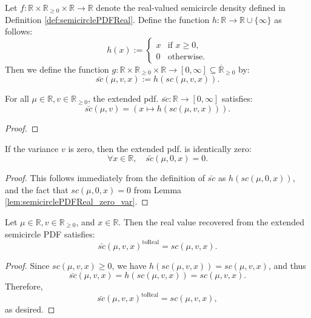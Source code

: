 \begin{definition}
  \label{def:semicirclePDF}
  \leanok
  Let $f : \mathbb{R} \times \mathbb{R}_{\geq 0} \times \mathbb{R} \to \mathbb{R}$ denote the real-valued semicircle density defined in Definition \ref{def:semicirclePDFReal}. Define the function $h: \mathbb{R} \to \mathbb{R} \cup \{\infty\} $ as follows:
  $$
  h(x) := \begin{cases}
x & \text{if } x \ge 0, \\
0 & \text{otherwise}.
\end{cases}
  $$
  Then we define the function $ g : \mathbb{R} \times \mathbb{R}_{\geq 0} \times \mathbb{R} \to [0,\infty] \subseteq \overline{\mathbb{R}}_{\ge 0}$ by:
    $$
    \bar{sc} (\mu,v,x) := h(sc(\mu,v,x)).
    $$
\end{definition}

\begin{lemma}
  \leanok
  \label{lem:semicirclePDF_def}
  For all $\mu \in \mathbb{R} , v \in \mathbb{R}_{\geq 0}$, the extended pdf. $ \bar{sc} : \mathbb{R} \to [0,\infty]$  satisfies:
  $$
    \bar{sc}(\mu,v) = \left( x \mapsto h(sc(\mu,v,x)) \right).
  $$
\end{lemma}
\begin{proof}
  \leanok
\end{proof}


\begin{lemma}
  \leanok
  \label{lem:semicirclePDF_zero_var}
  If the variance $v$ is zero, then the extended pdf. is identically zero:
 $$
    \forall x \in \mathbb{R}, \quad \bar{sc}(\mu,0,x) = 0.
 $$
\end{lemma}
\begin{proof}
    \leanok
    This follows immediately from the definition of $\bar{sc}$ as $h(sc(\mu,0,x))$, and the fact that $sc(\mu,0,x) = 0$ from Lemma \ref{lem:semicirclePDFReal_zero_var}.
\end{proof}

\begin{lemma}
    \leanok
    \label{lem:toReal_semicirclePDF}
    Let $ \mu \in \mathbb{R} ,  v \in \mathbb{R}_{\ge 0}$, and $x \in \mathbb{R} $.
Then the real value recovered from the extended semicircle PDF satisfies:
\[
    \bar{sc}(\mu, v, x)^{\operatorname{toReal}} = sc(\mu, v, x).
\]
\end{lemma}
\begin{proof}
  \leanok
Since $sc(\mu, v, x) \ge 0$, we have $h(sc(\mu, v, x)) = sc(\mu, v, x)$, and thus
\[
    \bar{sc}(\mu, v, x) = h(sc(\mu, v, x)) = sc(\mu, v, x).
\]
Therefore,
\[
    \bar{sc}(\mu, v, x)^{\operatorname{toReal}} = sc(\mu, v, x),
\]
as desired.
\end{proof}

